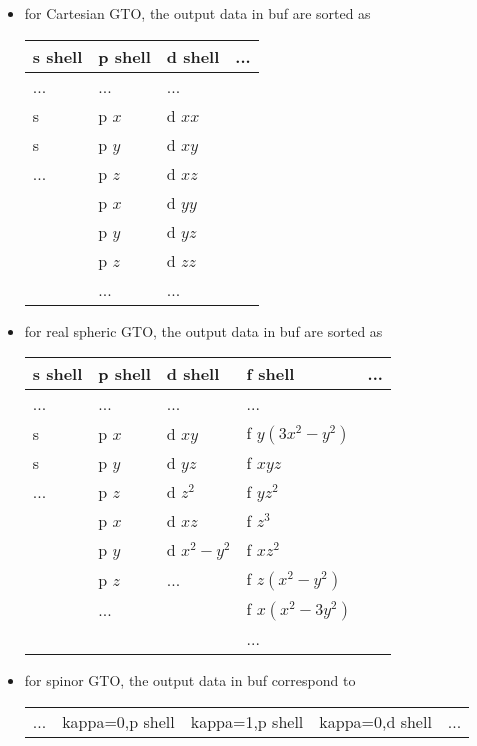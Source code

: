 \documentclass{article}
\begin{document}
\begin{itemize}
\item
  for Cartesian GTO, the output data in buf are sorted
  as\\\begin{tabular}{l|l|l|l}
\hline
    s shell & p shell & d shell & ... \\
\hline
    ...     & ...     & ...     & \\
    s       & p $x$   & d $xx$  & \\
    s       & p $y$   & d $xy$  & \\
    ...     & p $z$   & d $xz$  & \\
            & p $x$   & d $yy$  & \\
            & p $y$   & d $yz$  & \\
            & p $z$   & d $zz$  & \\
            & ...     & ...     & \\
\hline
\end{tabular}
\item
  for real spheric GTO, the output data in buf are sorted
  as\\\begin{tabular}{l|l|l|l|l}
\hline
    s shell & p shell & d shell     & f shell         & ... \\
\hline
    ...     & ...     & ...         & ...             & \\
    s       & p $x$   & d $xy     $ & f $y(3x^2-y^2)$ & \\
    s       & p $y$   & d $yz     $ & f $xyz        $ & \\
    ...     & p $z$   & d $z^2    $ & f $yz^2       $ & \\
            & p $x$   & d $xz     $ & f $z^3        $ & \\
            & p $y$   & d $x^2-y^2$ & f $xz^2       $ & \\
            & p $z$   & ...         & f $z(x^2-y^2) $ & \\
            & ...     &             & f $x(x^2-3y^2)$ & \\
            &         &             & ...             & \\
\hline
\end{tabular}
\item
  for spinor GTO, the output data in buf correspond
  to\\\begin{tabular}{l|l|l|l|l}
\hline
    ... & kappa=0,p shell & kappa=1,p shell & kappa=0,d shell & ... \\

\end{tabular}
\end{itemize}
\end{document}

